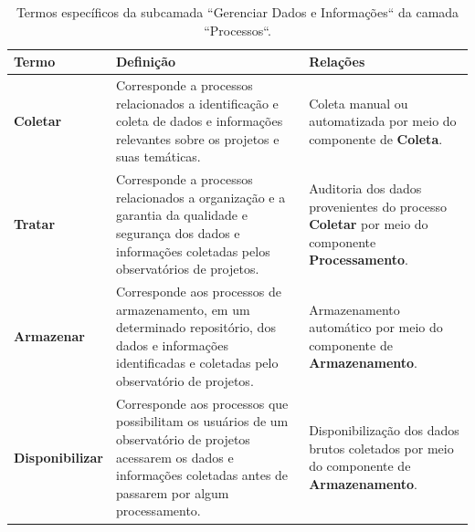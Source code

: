 \begin{apendicesenv}
\begin{table}[H]
\centering
\caption{Termos específicos da subcamada ``Gerenciar Dados e Informações`` da camada 
``Processos``.}
\begin{tabularx}{\textwidth}{|l|X|X|}
\hline
\textbf{Termo} & \textbf{Definição} & \textbf{Relações} \\ \hline
\textbf{Coletar}   & Corresponde a processos relacionados a identificação e coleta de dados e informações relevantes sobre os projetos e suas temáticas.  & Coleta manual ou automatizada por meio do componente de \textbf{Coleta}.\\ \hline
\textbf{Tratar}  & Corresponde a processos relacionados a organização e a garantia da qualidade e segurança dos dados e informações coletadas pelos observatórios de projetos. & Auditoria dos dados provenientes do processo \textbf{Coletar} por meio do componente \textbf{Processamento}. \\ \hline
\textbf{Armazenar}   & Corresponde aos processos de armazenamento, em um determinado repositório, dos dados e informações identificadas e coletadas pelo observatório de projetos.
 & Armazenamento automático por meio do componente de \textbf{Armazenamento}. \\ \hline
\textbf{Disponibilizar}   & Corresponde aos processos que possibilitam os usuários de um observatório de projetos acessarem os dados e informações coletadas antes de passarem por algum
processamento. & Disponibilização dos dados brutos coletados por meio do componente de \textbf{Armazenamento}. \\ \hline
\end{tabularx}
\end{table}


\end{apendicesenv}
